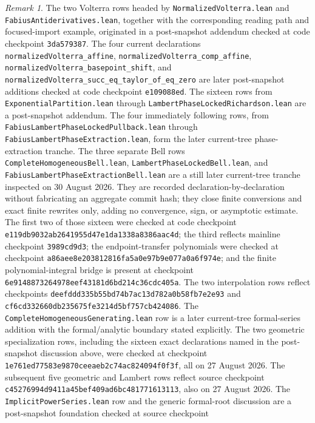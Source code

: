 \documentclass[11pt,oneside]{article}
\theoremstyle{definition}
\theoremstyle{remark}
\newtheorem{remark}[theorem]{Remark}
\begin{document}
\begin{remark}
The two Volterra rows headed by \nolinkurl{NormalizedVolterra.lean} and
\nolinkurl{FabiusAntiderivatives.lean}, together with the corresponding
reading path and focused-import example, originated in a post-snapshot addendum
checked at code checkpoint \nolinkurl{3da579387}.  The four current declarations
\nolinkurl{normalizedVolterra_affine},
\nolinkurl{normalizedVolterra_comp_affine},
\nolinkurl{normalizedVolterra_basepoint_shift}, and
\nolinkurl{normalizedVolterra_succ_eq_taylor_of_eq_zero} are later
post-snapshot additions checked at code checkpoint \nolinkurl{e109088ed}.
The sixteen rows from \nolinkurl{ExponentialPartition.lean} through
\nolinkurl{LambertPhaseLockedRichardson.lean} are a post-snapshot addendum.
The four immediately following rows, from
\nolinkurl{FabiusLambertPhaseLockedPullback.lean} through
\nolinkurl{FabiusLambertPhaseExtraction.lean}, form the later current-tree
phase-extraction tranche.
The three separate Bell rows
\nolinkurl{CompleteHomogeneousBell.lean},
\nolinkurl{LambertPhaseLockedBell.lean}, and
\nolinkurl{FabiusLambertPhaseExtractionBell.lean} are a still later
current-tree tranche inspected on 30 August 2026.  They are recorded
declaration-by-declaration without fabricating an aggregate commit hash; they
close finite conversions and exact finite rewrites only, adding no
convergence, sign, or asymptotic estimate.
The first two of those sixteen were checked at code checkpoint
\nolinkurl{e119db9032ab2641955d47e1da1338a8386aac4d}; the third reflects
mainline checkpoint \nolinkurl{3989cd9d3}; the endpoint-transfer polynomials
were checked at checkpoint
\nolinkurl{a86aee8e203812816fa5a0e97b9e077a0a6f974e}; and the finite
polynomial-integral bridge is present at checkpoint
\nolinkurl{6e9148873264978eef43181d6bd214c36cdc405a}.  The two interpolation
rows reflect checkpoints
\nolinkurl{deefddd335b55bd74b7ac13d782a0b58fb7e2e93} and
\nolinkurl{cf6cd332660db235675fe3214d5bf757cb424086}.
The \nolinkurl{CompleteHomogeneousGenerating.lean} row is a later current-tree
formal-series addition with the formal/analytic boundary stated explicitly.
The two geometric
specialization rows, including the sixteen exact declarations named in the
post-snapshot discussion above, were checked at checkpoint
\nolinkurl{1e761ed77583e9870ceeaeb2c74ac824094f0f3f}, all on 27 August 2026.
The subsequent five geometric and Lambert rows reflect source checkpoint
\nolinkurl{c45276994d9411a45bef409ad6bc481771613113}, also on 27 August 2026.
The \nolinkurl{ImplicitPowerSeries.lean} row and the generic formal-root
discussion are a post-snapshot foundation checked at source checkpoint

\end{remark}
\end{document}
